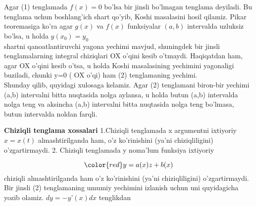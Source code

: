 \documentclass{beamer}
\begin{document}

\begin{frame}
\quad Agar (1) tenglamada $f(x)=0$ bo’lsa bir jinsli bo’lmagan tenglama deyiladi. Bu tenglama uchun boshlang’ich shart qo’yib, Koshi masalasini hosil qilamiz. Pikar teoremasiga ko’ra agar $g(x)$ va $f(x)$ funksiyalar $(a,b)$ intervalda uzluksiz bo’lsa, u holda 
\quad 
$y(x_{0})=y_0$
\\ 
\quad  shartni qanoatlantiruvchi yagona yechimi mavjud, shuningdek bir jinsli tenglamalarning integral chiziqlari OX o’qini kesib o’tmaydi.
Haqiqatdan ham, agar OX o’qini kesib o’tsa, u holda Koshi masalasining yechimini yagonaligi buziladi, chunki y=0 ( OX o’qi) ham (2) tenglamaning yechimi.
\\
\quad  Shunday qilib, quyidagi xulosaga kelamiz. Agar (2) tenglamani biron-bir yechimi (a,b) intervalni bitta nuqtasida nolga aylansa, u holda butun (a,b) intervalda nolga teng va aksincha (a,b) intervalni bitta nuqtasida nolga teng bo’lmasa, butun intervalda noldan farqli.
\end{frame}


\begin{frame}
\quad \textbf{Chiziqli tenglama xossalari } 
1.Chiziqli tenglamada x argumentni ixtiyoriy
$x=x(t) $
 almashtirilganda ham, o’z ko’rinishini (ya’ni chiziqliligini) o’zgartirmaydi.
 2. Chiziqli tenglamada y noma’lum funksiya ixtiyoriy

\begin{equation}
\color{red} y=a(x)z+b(x)
 \end{equation}
chiziqli almashtirilganda ham o’z ko’rinishini (ya’ni chiziqliligini) o’zgartirmaydi.\\
Bir jinsli (2) tenglamaning umumiy yechimini izlanish uchun uni quyidagicha yozib olamiz. $dy=-y’(x)dx$ tenglikdan  
\end{frame}
\end{document}
